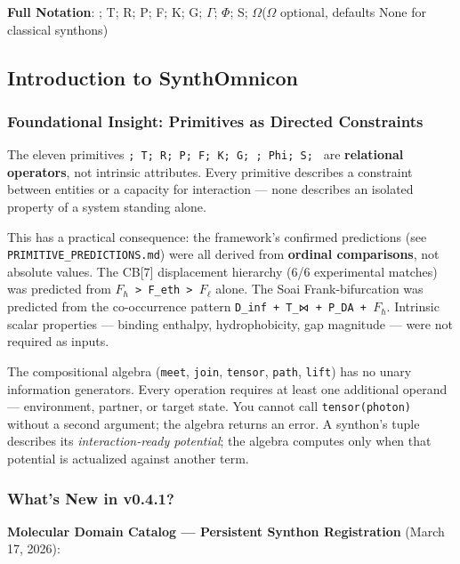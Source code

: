 \documentclass[12pt,a4paper]{article}
\begin{document}
\textbf{Full Notation}: \langleD; T; R; P; F; K; G; $\Gamma$; $\Phi$; S; $\Omega$\rangle  ($\Omega$ optional, defaults None for classical synthons)

\subsection{Introduction to SynthOmnicon}

\subsubsection{Foundational Insight: Primitives as Directed Constraints}

The eleven primitives \texttt{\langleD; T; R; P; F; K; G; \Gamma; Phi; S; \Omega\rangle} are \textbf{relational operators}, not intrinsic attributes. Every primitive describes a constraint between entities or a capacity for interaction --- none describes an isolated property of a system standing alone.

This has a practical consequence: the framework's confirmed predictions (see \texttt{PRIMITIVE\_PREDICTIONS.md}) were all derived from \textbf{ordinal comparisons}, not absolute values. The CB{[}7{]} displacement hierarchy (6/6 experimental matches) was predicted from \texttt{$F_{\hbar}$ \textgreater{} F\_eth \textgreater{} $F_{\ell}$} alone. The Soai Frank-bifurcation was predicted from the co-occurrence pattern \texttt{D\_inf + T\_⋈ + P\_DA + $F_{\hbar}$}. Intrinsic scalar properties --- binding enthalpy, hydrophobicity, gap magnitude --- were not required as inputs.

The compositional algebra (\texttt{meet}, \texttt{join}, \texttt{tensor}, \texttt{path}, \texttt{lift}) has no unary information generators. Every operation requires at least one additional operand --- environment, partner, or target state. You cannot call \texttt{tensor(photon)} without a second argument; the algebra returns an error. A synthon's tuple describes its \emph{interaction-ready potential}; the algebra computes only when that potential is actualized against another term.

\subsubsection{What's New in v0.4.1?}

\textbf{Molecular Domain Catalog --- Persistent Synthon Registration} (March 17, 2026):
\end{document}
